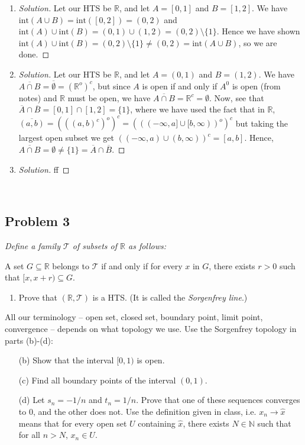 \documentclass{article}
\newcommand{\N}{{\mathbb N}}
\newcommand{\R}{{\mathbb R}}
\begin{document}
\begin{enumerate}
	\item \begin{proof}[Solution]\let\qed\relax
		Let our HTS be $\R$,
		and let $A = [0,1]$ and $B = [1,2]$.
		We have $\mathrm{int}(A\cup B) = \mathrm{int}([0,2]) = (0,2)$
		and $\mathrm{int}(A) \cup \mathrm{int}(B) = (0,1) \cup (1,2) = (0,2)\setminus \{1\}$.
		Hence we have shown $\mathrm{int}(A)\cup\mathrm{int}(B) = (0,2)\setminus\{1\}
		\neq (0,2) = \mathrm{int}(A\cup B)$,
		so we are done.
	\end{proof}
	\item \begin{proof}[Solution]\let\qed\relax
		Let our HTS be $\R$,
		and let $A = (0,1)$ and $B = (1,2)$.
		We have $\overline{A \cap B} = \overline{\emptyset} = (\R^o)^c$,
		but since $A$ is open if and only if $A^0$ is open (from notes)
		and $\R$ must be open, we have $\overline{A\cap B} = \R^c = \emptyset$.
		Now, see that $\overline{A} \cap \overline{B} = [0,1] \cap [1,2] = \{1\}$,
		where we have used the fact that in $\R$, $\overline{(a,b)} = (((a,b)^c)^o)^c
		= (((-\infty,a]\cup [b,\infty))^o)^c$ but taking the largest
		open subset we get $((-\infty,a)\cup (b,\infty))^c = [a,b]$.
		Hence, $\overline{A \cap B} = \emptyset \neq \{1\} = \overline{A} \cap \overline{B}$.
	\end{proof}
	\item \begin{proof}[Solution]\let\qed\relax
		ff
	\end{proof}
\end{enumerate}
\clearpage
~\clearpage

\subsection*{Problem 3}
{\it Define a family $\mathcal{T}$ of subsets of $\R$ as follows:
	\begin{center}
		A set $G \subseteq \R$ belongs to $\mathcal{T}$ if and only if
		for every $x$ in $G$, there exists $r>0$ such that $[x,x+r)\subseteq G$.
	\end{center}
	\begin{enumerate}
		\item Prove that $(\R,\mathcal{T})$ is a HTS. (It is called the \emph{Sorgenfrey line}.)
	\end{enumerate}
	All our terminology -- open set, closed set, boundary point, limit point, convergence
	-- depends on what topology we use. Use the Sorgenfrey topology in parts (b)-(d):
	\begin{enumerate}
		\item[(b)] Show that the interval $[0,1)$ is open.
		\item[(c)] Find all boundary points of the interval $(0,1)$.
		\item[(d)] Let $s_n = -1/n$ and $t_n=1/n$.
			Prove that one of these sequences converges to $0$, and the other does not.
			Use the definition given in class, i.e. $x_n \to \hat{x}$
			means that for every open set $U$ containing $\hat{x}$,
			there exists $N \in \N$ such that for all $n > N$, $x_n \in U$.
\end{enumerate}}
\end{document}
